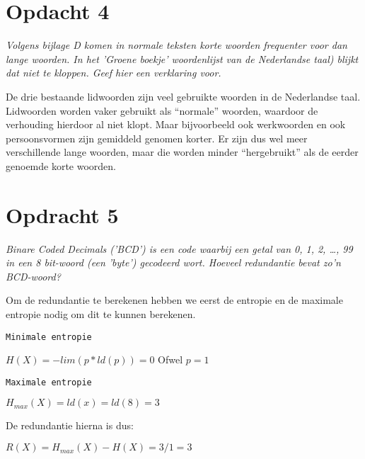 \section{Opdacht 4}
\emph{Volgens bijlage D komen in normale teksten korte woorden frequenter voor dan lange woorden. In het 'Groene boekje' woordenlijst van de Nederlandse taal) blijkt dat niet te kloppen.  Geef hier een verklaring voor.}

De drie bestaande lidwoorden zijn veel gebruikte woorden in de Nederlandse taal. Lidwoorden worden vaker gebruikt als ``normale'' woorden, waardoor de verhouding hierdoor al niet klopt. Maar bijvoorbeeld ook werkwoorden en ook persoonsvormen zijn gemiddeld genomen korter. Er zijn dus wel meer verschillende lange woorden, maar die worden minder ``hergebruikt'' als de eerder genoemde korte woorden. 

\section{Opdracht 5}
\emph{Binare Coded Decimals ('BCD') is een code waarbij een getal van 0, 1, 2, \ldots, 99 in een 8 bit-woord (een '\emph{byte}') gecodeerd wort. Hoeveel redundantie bevat zo'n BCD-woord?}

Om de redundantie te berekenen hebben we eerst de entropie en de maximale entropie nodig om dit te kunnen berekenen.

\texttt{Minimale entropie}

$H(X)=-lim(p*ld(p))=0$
Ofwel
$p=1$

\texttt{Maximale entropie}

$H_{max}(X)=ld(x)=ld(8)=3$

De redundantie hierna is dus:

$R(X)=H_{max}(X)-H(X)=3/1=3$
